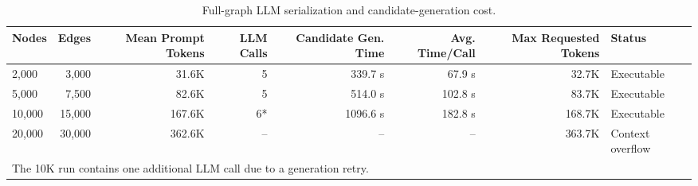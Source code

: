 \begin{table}[t]
\centering
\caption{Full-graph LLM serialization and candidate-generation cost.}
\label{tab:scalability_cost}
\small
\begin{tabular}{lrrrrrrl}
\toprule
Nodes & Edges & Mean Prompt Tokens & LLM Calls & Candidate Gen. Time & Avg. Time/Call & Max Requested Tokens & Status \\
\midrule
2,000 & 3,000 & 31.6K & 5 & 339.7 s & 67.9 s & 32.7K & Executable \\
5,000 & 7,500 & 82.6K & 5 & 514.0 s & 102.8 s & 83.7K & Executable \\
10,000 & 15,000 & 167.6K & 6* & 1096.6 s & 182.8 s & 168.7K & Executable \\
20,000 & 30,000 & 362.6K & -- & -- & -- & 363.7K & Context overflow \\
\bottomrule
\multicolumn{8}{l}{\footnotesize * The 10K run contains one additional LLM call due to a generation retry.} \\
\end{tabular}
\end{table}
